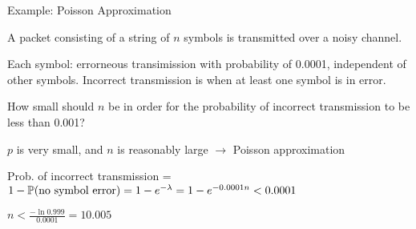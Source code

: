 \begin{frame}{Example: Poisson Approximation}
  
  \plitemsep 0.1in
  \bci 
\item A packet consisting of a string of $n$ symbols is transmitted
  over a noisy channel.
  
\item<2-> Each symbol: errorneous transimission with
  probability of 0.0001, independent of other symbols. Incorrect
  transmission is when at least one symbol is in error. 
  
\item<3-> \question How small should $n$ be in order for the probability of
  incorrect transmission to be less than 0.001?
  
\item<4-> $p$ is very small, and $n$ is reasonably large $\rightarrow$
  Poisson approximation
  
\item<5-> Prob. of incorrect transmission = $1 - \mathbb{P}( \text{no symbol
      error} ) = 1-e^{-\lambda}= 1-e^{-0.0001n} < 0.0001$  

\item<6-> $n < \frac{-\ln 0.999}{0.0001} = 10.005$
  \eci 
  
\end{frame}



